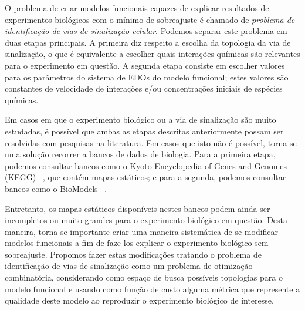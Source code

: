 \documentclass[12pt]{article}
\begin{document}


O problema de criar modelos funcionais capazes de explicar resultados
de experimentos biológicos com o mínimo de sobreajuste é chamado de 
{\em problema de identificação de vias de sinalização celular}. Podemos 
separar este problema em duas etapas principais. A primeira diz respeito
a escolha da topologia da via de sinalização, o que é equivalente a 
escolher quais interações químicas são relevantes para o experimento em
questão. A segunda etapa consiste em escolher valores para os parâmetros
do sistema de EDOs do modelo funcional; estes valores são constantes de 
velocidade de interações e/ou concentrações iniciais de espécies 
químicas.

Em casos em que o experimento biológico ou a via de sinalização são 
muito estudadas, é possível que ambas as etapas descritas anteriormente
possam ser resolvidas com pesquisas na literatura. Em casos que isto não
é possível, torna-se uma solução recorrer a bancos de dados de biologia.
Para a primeira etapa, podemos consultar bancos como o 
\href{http://www.genome.jp/kegg/}{Kyoto Encyclopedia of Genes and Genomes (KEGG)}
~\cite{Kanehisa2000kegg}, que contém mapas estáticos; e para a segunda,
podemos consultar bancos como o 
\href{https://www.ebi.ac.uk/biomodels-main/}{BioModels}~\cite{le2006biomodels}
.

Entretanto, os mapas estáticos disponíveis nestes bancos podem ainda ser
incompletos ou muito grandes para o experimento biológico em questão. 
Desta maneira, torna-se importante criar uma maneira sistemática de se
modificar modelos funcionais a fim de faze-los explicar o experimento 
biológico sem sobreajuste. Propomos fazer estas modificações tratando
o problema de identificação de vias de sinalização como um problema de
otimização combinatória, considerando como espaço de busca possíveis 
topologias para o modelo funcional e usando como função de custo alguma
métrica que represente a qualidade deste modelo ao reproduzir o 
experimento biológico de interesse.
\end{document}
